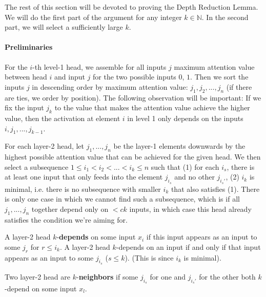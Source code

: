 \documentclass[11pt,a4paper]{article}
\begin{document}

The rest of this section will be devoted to proving the Depth Reduction Lemma.
We will do the first part of the argument for any integer $k \in \mathbb{N}$.
In the second part, we will select a sufficiently large $k$.

\paragraph{Preliminaries}
For the $i$-th level-1 head, we assemble for all inputs $j$ maximum attention value between head $i$ and input $j$ for the two possible inputs $0$, $1$.
Then we sort the inputs $j$ in descending order by maximum attention value: $j_1, j_2, ..., j_n$ (if there are ties, we order by position).
The following observation will be important: If we fix the input $j_k$ to the value that makes the attention value achieve the higher value, then the activation at element $i$ in level 1 only depends on the inputs $i, j_1, ..., j_{k-1}$.


For each layer-2 head, let $j_1, ..., j_n$ be the layer-1 elements downwards by the highest possible attention value that can be achieved for the given head.
We then select a subsequence $1 \leq i_1 < i_2 < ... < i_k \leq n$ such that (1) for each $i_s$, there is at least one input that only feeds into the element $j_{i_s}$ and no other $j_{i_s'}$, (2) $i_k$ is minimal, i.e. there is no subsequence with smaller $i_k$ that also satisfies (1).
There is only one case in which we cannot find such a subsequence, which is if all $j_1, ..., j_n$ together depend only on $< ck$ inputs, in which case this head already satisfies the condition we're aiming for.

A layer-2 head $k$-\textbf{depends} on some input $x_i$ if this input appears as an input to some $j_r$ for $r \leq i_k$.
A layer-2 head $k$-depends on an input if and only if that input appears as an input to some $j_{i_s}$ ($s \leq k$). (This is since $i_k$ is minimal).

Two layer-2 head are $k$-\textbf{neighbors} if some $j_{i_s}$ for one and $j_{i_s'}$ for the other both $k$-depend on some input $x_l$.

\end{document}
